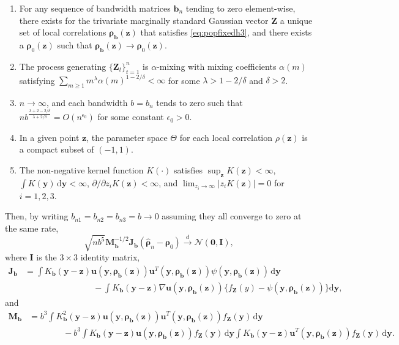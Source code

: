 \documentclass[
  12pt,
  letterpaper]{article}
\providecommand{\tightlist}{%
  \setlength{\itemsep}{0pt}\setlength{\parskip}{0pt}}
\newcommand{\Z}{\bm{Z}}
\newcommand{\z}{\bm{z}}
\newcommand{\y}{\bm{y}}
\newcommand{\fu}{\bm{u}}
\newcommand{\frho}{\bm{\rho}}
\newcommand{\hfrho}{\widehat{\bm{\rho}}}
\newcommand{\hh}{\bm{b}}
\newcommand{\Jb}{\bm{J}_{\hh}}
\newcommand{\Mb}{\bm{M}_{\hh}}
\theoremstyle{definition}
\theoremstyle{definition}
\theoremstyle{definition}
\theoremstyle{remark}
\begin{document}
\begin{enumerate}
\def\labelenumi{\arabic{enumi}.}
\tightlist
\item
  For any sequence of bandwidth matrices \(\hh_n\) tending to zero element-wise, there exists for the trivariate marginally standard Gaussian vector \(\Z\) a unique set of local correlations \(\frho_{\hh}(\z)\) that satisfies \eqref{eq:popfixedh3}, and there exists a \(\frho_0(\z)\) such that \(\frho_{\hh}(\z) \rightarrow \frho_0(\z)\).
\item
  The process generating \(\{\Z_t\}_{t=1}^n\) is \(\alpha\)-mixing with mixing coefficients \(\alpha(m)\) satisfying \(\sum_{m\geq1}m^{\lambda}\alpha(m)^{1-2/\delta} < \infty\) for some \(\lambda > 1-2/\delta\) and \(\delta>2\).
\item
  \(n\rightarrow\infty\), and each bandwidth \(b = b_n\) tends to zero such that \(nb^{\frac{\lambda+2-2/\delta}{\lambda + 2/\delta}} = O(n^{\epsilon_0})\) for some constant \(\epsilon_0 > 0\).
\item
  In a given point \(\z\), the parameter space \(\Theta\) for each local correlation \(\rho(\z)\) is a compact subset of \((-1,1)\).
\item
  The non-negative kernel function \(K(\cdot)\) satisfies \(\sup_{\z}K(\z) < \infty\), \(\int K(\y)\,\textrm{d}\y < \infty\), \(\partial/\partial z_iK(\z) <\infty\), and \(\lim_{z_i \rightarrow \infty}|z_iK(\z)| = 0\) for \(i = 1,2,3\).
\end{enumerate}

Then, by writing \(b_{n1} = b_{n2} = b_{n3} = b \rightarrow 0\) assuming they all converge to zero at the same rate,
\begin{equation}
\sqrt{nb^5}\Mb^{-1/2}\Jb\left(\hfrho_n - \frho_0\right) \stackrel{d}{\rightarrow} \mathcal{N}(\bm{0}, \bm{I}),
\label{eq:an3}
\end{equation}
where \(\bm{I}\) is the \(3\times3\) identity matrix,
\begin{align*}
\Jb &= \int K_{\hh}(\y - \z)\fu(\y, \frho_{\hh}(\z))\fu^T(\y, \frho_{\hh}(\z))\psi(\y,\frho_{\hh}(\z))\,\textrm{d}\y \\
& \qquad\qquad\qquad\qquad - \int K_{\hh}(\y - \z)\nabla\fu(\y,\frho_{\hh}(\z))\Big\{f_{\Z}(y) - \psi(\y,\frho_{\hh}(\z))\Big\}\textrm{d}\y,
\end{align*}
and
\begin{align*}
\Mb &= b^3\int K^2_{\hh}(\y - \z)\fu(\y, \frho_{\hh}(\z))\fu^T(\y,\frho_{\hh}(\z))f_{\Z}(\y)\,\textrm{d}\y \\
& \qquad\qquad - b^3\int K_{\hh}(\y - \z)\fu(\y, \frho_{\hh}(\z))f_{\Z}(\y)\,\textrm{d}\y \int K_{\hh}(\y - \z)\fu^T(\y, \frho_{\hh}(\z))f_{\Z}(\y)\,\textrm{d}\y.
\end{align*}
\end{document}
